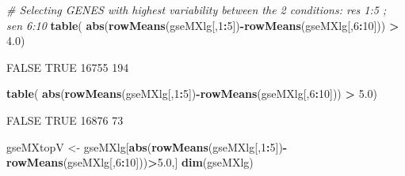 \documentclass[
]{article}
\newenvironment{Shaded}{\begin{snugshade}}{\end{snugshade}}
\newcommand{\CommentTok}[1]{\textcolor[rgb]{0.56,0.35,0.01}{\textit{#1}}}
\newcommand{\DecValTok}[1]{\textcolor[rgb]{0.00,0.00,0.81}{#1}}
\newcommand{\FloatTok}[1]{\textcolor[rgb]{0.00,0.00,0.81}{#1}}
\newcommand{\FunctionTok}[1]{\textcolor[rgb]{0.13,0.29,0.53}{\textbf{#1}}}
\newcommand{\NormalTok}[1]{#1}
\newcommand{\OtherTok}[1]{\textcolor[rgb]{0.56,0.35,0.01}{#1}}
\newcommand{\SpecialCharTok}[1]{\textcolor[rgb]{0.81,0.36,0.00}{\textbf{#1}}}
\begin{document}
\begin{Shaded}
\begin{Highlighting}[]
\CommentTok{\# Selecting GENES with highest variability between the 2 conditions: res 1:5 ; sen 6:10}
\FunctionTok{table}\NormalTok{( }\FunctionTok{abs}\NormalTok{(}\FunctionTok{rowMeans}\NormalTok{(gseMXlg[,}\DecValTok{1}\SpecialCharTok{:}\DecValTok{5}\NormalTok{])}\SpecialCharTok{{-}}\FunctionTok{rowMeans}\NormalTok{(gseMXlg[,}\DecValTok{6}\SpecialCharTok{:}\DecValTok{10}\NormalTok{])) }\SpecialCharTok{\textgreater{}} \FloatTok{4.0}\NormalTok{)}
\end{Highlighting}
\end{Shaded}

\begin{Shaded}
\begin{Highlighting}[]
\NormalTok{FALSE  TRUE }
\NormalTok{16755   194 }
\end{Highlighting}
\end{Shaded}

\begin{Shaded}
\begin{Highlighting}[]
\FunctionTok{table}\NormalTok{( }\FunctionTok{abs}\NormalTok{(}\FunctionTok{rowMeans}\NormalTok{(gseMXlg[,}\DecValTok{1}\SpecialCharTok{:}\DecValTok{5}\NormalTok{])}\SpecialCharTok{{-}}\FunctionTok{rowMeans}\NormalTok{(gseMXlg[,}\DecValTok{6}\SpecialCharTok{:}\DecValTok{10}\NormalTok{])) }\SpecialCharTok{\textgreater{}} \FloatTok{5.0}\NormalTok{)}
\end{Highlighting}
\end{Shaded}

\begin{Shaded}
\begin{Highlighting}[]
\NormalTok{FALSE  TRUE }
\NormalTok{16876    73 }
\end{Highlighting}
\end{Shaded}

\begin{Shaded}
\begin{Highlighting}[]
\NormalTok{gseMXtopV }\OtherTok{\textless{}{-}}\NormalTok{ gseMXlg[}\FunctionTok{abs}\NormalTok{(}\FunctionTok{rowMeans}\NormalTok{(gseMXlg[,}\DecValTok{1}\SpecialCharTok{:}\DecValTok{5}\NormalTok{])}\SpecialCharTok{{-}}\FunctionTok{rowMeans}\NormalTok{(gseMXlg[,}\DecValTok{6}\SpecialCharTok{:}\DecValTok{10}\NormalTok{]))}\SpecialCharTok{\textgreater{}}\FloatTok{5.0}\NormalTok{,]}
\FunctionTok{dim}\NormalTok{(gseMXlg)}
\end{Highlighting}
\end{Shaded}
\end{document}
